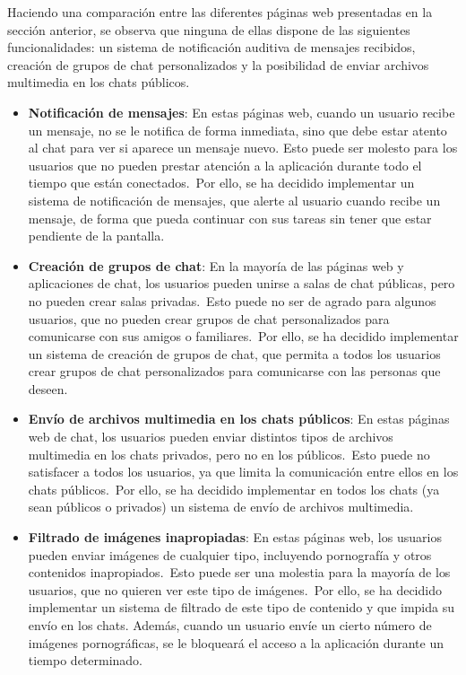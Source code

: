 
Haciendo una comparación entre las diferentes páginas web presentadas en la sección anterior, se
observa que ninguna de ellas dispone de las siguientes funcionalidades: un sistema de notificación auditiva
de mensajes recibidos, creación de grupos de chat personalizados y la posibilidad de enviar archivos
multimedia en los chats públicos.

\begin{itemize}
	\item \textbf{Notificación de mensajes}: En estas páginas web, cuando un usuario recibe un mensaje, no se le
	notifica de forma inmediata, sino que debe estar atento al chat para ver si aparece un mensaje nuevo.
	Esto puede ser molesto para los usuarios que no pueden prestar atención a la aplicación durante todo el
	tiempo que están conectados.\ Por ello, se ha decidido implementar un sistema de notificación de mensajes,
	que alerte al usuario cuando recibe un mensaje, de forma que pueda continuar con sus tareas sin tener que
	estar pendiente de la pantalla.

	\item \textbf{Creación de grupos de chat}: En la mayoría de las páginas web y aplicaciones de chat, los usuarios
	pueden unirse a salas de chat públicas, pero no pueden crear salas privadas.\ Esto puede no ser de agrado
	para algunos usuarios, que no pueden crear grupos de chat personalizados para comunicarse con sus amigos o
	familiares.\ Por ello, se ha decidido implementar un sistema de creación de grupos de chat, que permita a
	todos los usuarios crear grupos de chat personalizados para comunicarse con las personas que deseen.

	\item \textbf{Envío de archivos multimedia en los chats públicos}: En estas páginas web
	de chat, los usuarios pueden enviar distintos tipos de archivos multimedia en los chats privados, pero no en
	los públicos.\ Esto puede no satisfacer a todos los usuarios, ya que limita la comunicación entre ellos en
	los chats públicos.\ Por ello, se ha decidido implementar en todos los chats (ya sean públicos o privados) un
	sistema de envío de archivos multimedia.

	\item \textbf{Filtrado de imágenes inapropiadas}: En estas páginas web, los usuarios pueden enviar imágenes
	de cualquier tipo, incluyendo pornografía y otros contenidos inapropiados.\ Esto puede ser una molestia para
	la mayoría de los usuarios, que no quieren ver este tipo de imágenes.\ Por ello, se ha decidido implementar
	un sistema de filtrado de este tipo de contenido y que impida su envío en los chats.
	Además, cuando un usuario envíe un cierto número de imágenes pornográficas, se le bloqueará el acceso a la
	aplicación durante un tiempo determinado.
\end{itemize}
